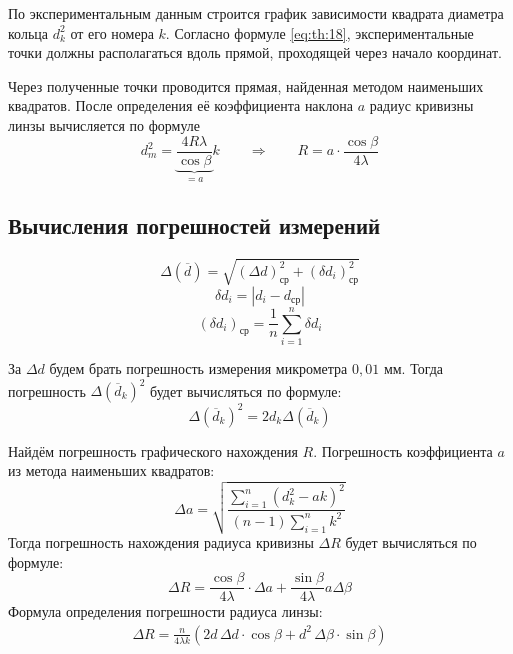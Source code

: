 По экспериментальным данным строится график зависимости квадрата диаметра кольца $d_k^2$ от его номера $k$. Согласно формуле \cref{eq:th:18}, экспериментальные точки должны располагаться вдоль прямой, проходящей через начало координат.

Через полученные точки проводится прямая, найденная методом наименьших квадратов. После определения её коэффициента наклона $a$ радиус кривизны линзы вычисляется по формуле
\[
d_m^2 = \underbrace{\frac{4 R \lambda}{\cos \beta}}_{=a} k \qquad\Rightarrow\qquad \boxed{R = a \cdot \frac{\cos \beta}{4 \lambda}}
\]

\subsection{Вычисления погрешностей измерений}

\[
\Delta (\overline{d}) = \sqrt{(\Delta d)_{\text{ср}}^2 + (\delta d_i)_{\text{ср}}^2 }
\]
\[
\delta d_i = |d_i - d_\text{ср}|
\]
\[
(\delta d_i)_\text{ср} = \frac1{n} \sum\limits_{i = 1}^{n} \delta d_i
\]

За $\Delta d$ будем брать погрешность измерения микрометра $0,01 $ мм. Тогда погрешность $\Delta (\overline{d}_k)^2$ будет вычисляться по формуле:
\[
\Delta (\overline{d}_k)^2 = 2 d_k \Delta (\overline{d}_k) 
\]

Найдём погрешность графического нахождения $R$. Погрешность коэффициента $a$ из метода наименьших квадратов:
\[
\Delta a = \sqrt{
	\frac{
		\sum\limits_{i=1}^{n} (d_k^2 - ak)^2
	}{
		(n - 1) \sum\limits_{i = 1}^{n}k^2
	}
}
\]
Тогда погрешность нахождения радиуса кривизны $\Delta R$ будет вычисляться по формуле:
\[
\Delta R = 
	\frac{
		\cos \beta
	}{
		4\lambda
	} \cdot \Delta a + 
	\frac{
		\sin \beta
	}{
		4 \lambda
	} a \Delta \beta
\]
Формула определения погрешности радиуса линзы:
\begin{align} \label{eq:th:2}
	\Delta R = \frac{n}{4 \lambda k} \left(2d\, \Delta d \cdot \cos \beta + d^2 \, \Delta \beta \cdot \sin \beta\right)
\end{align}

